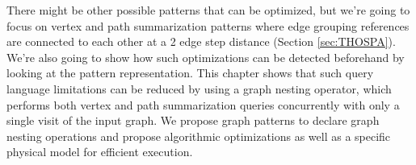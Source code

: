 There might be other possible patterns that can be optimized, but we're going to focus on vertex and path summarization patterns where edge grouping references are connected to each other at a 2 edge step distance (Section \ref{sec:THOSPA}). We're also going to show how such optimizations can be detected beforehand by looking at the pattern representation.
This chapter shows that such query language limitations can be reduced by using a graph nesting operator, which performs both vertex and path summarization queries concurrently with only a single visit of the input graph. %
We propose graph patterns to declare graph nesting operations and propose algorithmic optimizations as well as a specific physical model for efficient execution.




